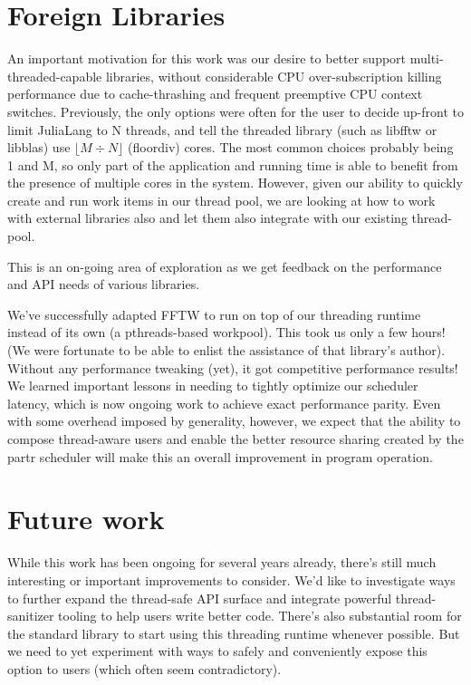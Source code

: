 \documentclass{juliacon}
\begin{document}
\section{Foreign Libraries}
\label{subsub:ffi}

An important motivation for this work was our desire to better support multi-threaded-capable libraries, without considerable CPU over-subscription killing performance due to cache-thrashing and frequent preemptive CPU context switches. Previously, the only options were often for the user to decide up-front to limit JuliaLang to N threads, and tell the threaded library (such as libfftw or libblas) use $\lfloor M \div N \rfloor$ (floordiv) cores. The most common choices probably being 1 and M, so only part of the application and running time is able to benefit from the presence of multiple cores in the system. However, given our ability to quickly create and run work items in our thread pool, we are looking at how to work with external libraries also and let them also integrate with our existing thread-pool.

This is an on-going area of exploration as we get feedback on the performance and API needs of various libraries.

We've successfully adapted FFTW to run on top of our threading runtime instead of its own (a pthreads-based workpool). This took us only a few hours! (We were fortunate to be able to enlist the assistance of that library's author). Without any performance tweaking (yet), it got competitive performance results! We learned important lessons in needing to tightly optimize our scheduler latency, which is now ongoing work to achieve exact performance parity. Even with some overhead imposed by generality, however, we expect that the ability to compose thread-aware users and enable the better resource sharing created by the partr scheduler will make this an overall improvement in program operation.

\section{Future work}
\label{subsub:future}

While this work has been ongoing for several years already, there's still much interesting or important improvements to consider. We'd like to investigate ways to further expand the thread-safe API surface and integrate powerful thread-sanitizer tooling to help users write better code. There's also substantial room for the standard library to start using this threading runtime whenever possible. But we need to yet experiment with ways to safely and conveniently expose this option to users (which often seem contradictory).
\end{document}
